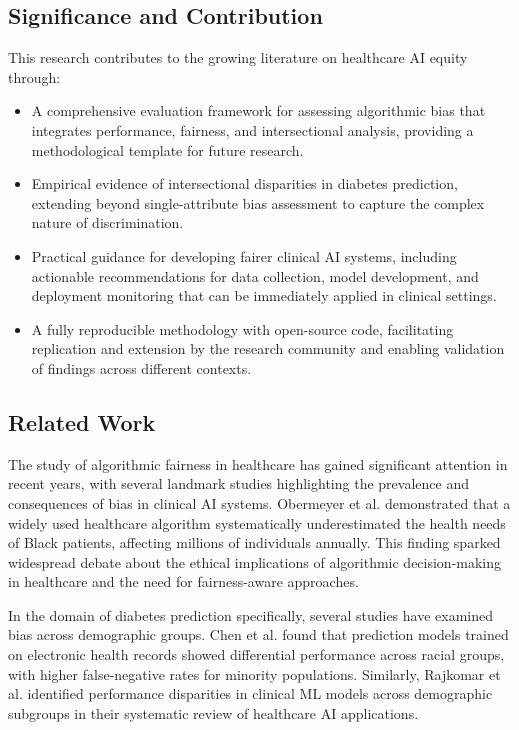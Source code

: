 \subsection{Significance and Contribution}

This research contributes to the growing literature on healthcare AI equity 
through:

\begin{itemize}[leftmargin=*]
    \item A comprehensive evaluation framework for assessing algorithmic bias 
          that integrates performance, fairness, and intersectional analysis, 
          providing a methodological template for future research.
    \item Empirical evidence of intersectional disparities in diabetes 
          prediction, extending beyond single-attribute bias assessment to 
          capture the complex nature of discrimination.
    \item Practical guidance for developing fairer clinical AI systems, 
          including actionable recommendations for data collection, model 
          development, and deployment monitoring that can be immediately 
          applied in clinical settings.
    \item A fully reproducible methodology with open-source code, facilitating 
          replication and extension by the research community and enabling 
          validation of findings across different contexts.
\end{itemize}

\subsection{Related Work}

The study of algorithmic fairness in healthcare has gained significant 
attention in recent years, with several landmark studies highlighting the 
prevalence and consequences of bias in clinical AI systems. Obermeyer et 
al. \cite{obermeyer2019} demonstrated that a widely used healthcare 
algorithm systematically underestimated the health needs of Black patients, 
affecting millions of individuals annually. This finding sparked widespread 
debate about the ethical implications of algorithmic decision-making in 
healthcare and the need for fairness-aware approaches.

In the domain of diabetes prediction specifically, several studies have 
examined bias across demographic groups. Chen et al. \cite{chen2019} found 
that prediction models trained on electronic health records showed differential 
performance across racial groups, with higher false-negative rates for 
minority populations. Similarly, Rajkomar et al. \cite{rajkomar2018} 
identified performance disparities in clinical ML models across demographic 
subgroups in their systematic review of healthcare AI applications.

